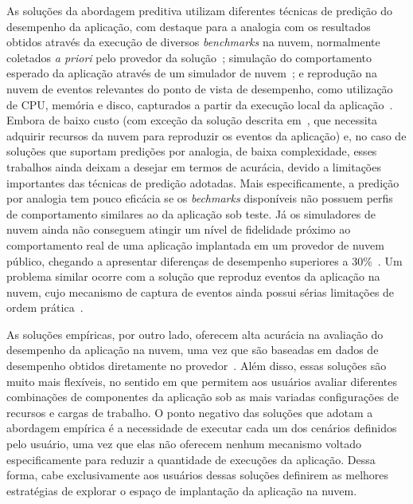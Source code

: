 \documentclass[12pt]{article}
\begin{document}
As soluções da abordagem preditiva utilizam diferentes técnicas de predição do desempenho da aplicação, com destaque para a analogia com os resultados obtidos através da execução de diversos {\em benchmarks} na nuvem, normalmente coletados {\em a priori} pelo provedor da solução~\cite{malkowski2010cloudxplor,cloudharmony,li2011,jung2013cloudadvisor}; simulação do comportamento esperado da aplicação através de um simulador de nuvem~\cite{fittkau2012cdosim}; e reprodução na nuvem de eventos relevantes do ponto de vista de desempenho, como utilização de CPU, memória e disco, capturados a partir da execução local da aplicação~\cite{li2011cloudprophet}. Embora de baixo custo (com
exceção da solução descrita em~\cite{li2011cloudprophet}, que necessita adquirir recursos da nuvem para reproduzir os eventos da aplicação) e, no caso de soluções que suportam predições por analogia, de baixa complexidade, esses trabalhos ainda deixam a desejar em termos de acurácia, devido a limitações importantes das técnicas de predição adotadas. Mais especificamente, a predição por analogia tem pouco eficácia se os {\em bechmarks} disponíveis não possuem perfis de comportamento similares ao da aplicação sob teste. Já os simuladores de nuvem ainda não conseguem atingir um nível de fidelidade próximo ao comportamento real de uma aplicação implantada em um provedor de nuvem público, chegando a apresentar diferenças de desempenho superiores a 30\%~\cite{fittkau2012cdosim}. Um problema similar ocorre com a solução que reproduz eventos da aplicação na nuvem, cujo mecanismo de captura de eventos ainda possui sérias limitações de ordem prática~\cite{li2011cloudprophet}.

As soluções empíricas, por outro lado, oferecem alta acurácia na avaliação do desempenho da aplicação na nuvem, uma vez que são baseadas em dados de desempenho obtidos diretamente no provedor~\cite{jayasinghe2012,silva2013cloudbench,cunha2013b,scheuner2014cloud}. Além disso, essas soluções são muito mais flexíveis, no sentido em que permitem aos usuários avaliar diferentes combinações de componentes da aplicação sob as mais variadas configurações de recursos e cargas de trabalho. O ponto negativo das soluções que adotam a abordagem empírica é a necessidade de executar cada um dos cenários definidos pelo usuário, uma vez que elas não oferecem nenhum mecanismo voltado especificamente para reduzir a quantidade de execuções da aplicação. Dessa forma, cabe exclusivamente aos usuários dessas soluções definirem as melhores estratégias de explorar o espaço de implantação da aplicação na nuvem.
\end{document}
